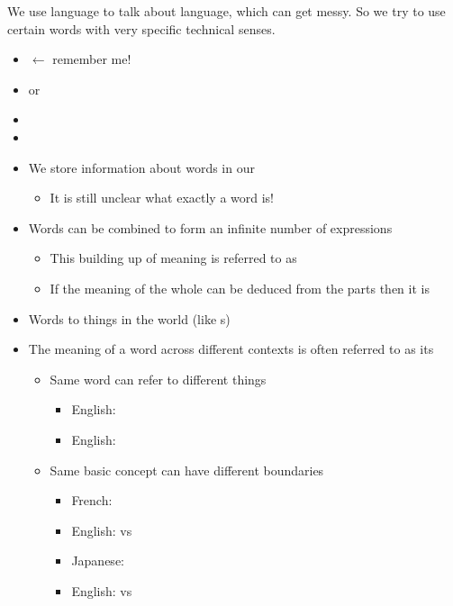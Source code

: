 \documentclass[a4paper,landscape,headrule,footrule,xetex,25pt]{foils}
\begin{document}

We use language to talk about language, which can get messy.  So we
try to use certain words with very specific technical senses.

\begin{itemize}
\item {} $\leftarrow$ remember me!
\item {} or 
\item {}
\item {}
\end{itemize}


\begin{itemize}
\item We store information about words in our 
  \begin{itemize}
  \item It is still unclear what exactly a word is!
  \end{itemize}
\item Words can be combined to form an infinite number of expressions
  \begin{itemize}
  \item This building up of meaning is referred to as 
  \item If the meaning of the whole can be deduced from the parts then it is 
  \end{itemize}
\end{itemize}


\begin{itemize}
\item Words  to things in the world (like s)
\item The meaning of a word across different contexts is often referred to as its 
  \begin{itemize}
  \item Same word can refer to different things
    \begin{itemize}
    \item English: 
    \item English: 
    \end{itemize}
  \item Same basic concept can have different boundaries
    \begin{itemize}
    \item French: 
    \item English:  vs 
      
    \item Japanese: 
    \item English:  vs 
    \end{itemize}
  \end{itemize}
\end{itemize}
\end{document}
